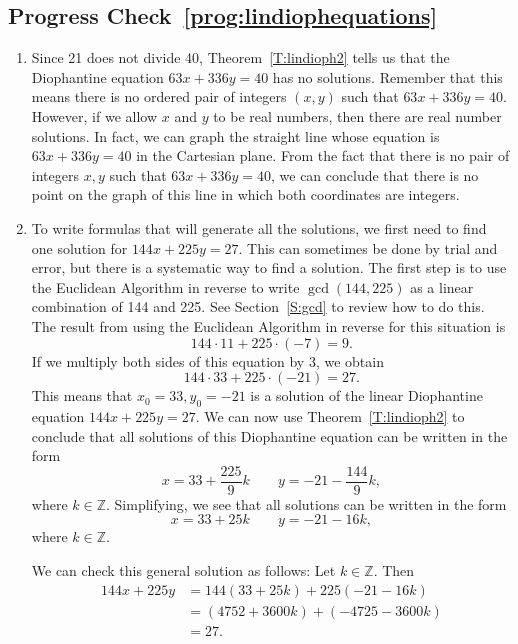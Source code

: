 \subsection*{Progress Check~\ref{prog:lindiophequations}}
\begin{enumerate}
\item Since 21 does not divide 40, Theorem~\ref{T:lindioph2} tells us that the Diophantine equation $63x + 336y = 40$ has no solutions.  
Remember that this means there is no ordered pair of integers $( x, y )$ such that 
$63x + 336y = 40$.  However, if we allow $x$ and $y$ to be real numbers, then there are real number solutions.  In fact, we can graph the straight line whose equation is 
$63x + 336y = 40$ in the Cartesian plane.  From the fact that there is no pair of integers $x, y$ such that $63x + 336y = 40$, we can conclude that there is no point on the graph of this line in which both coordinates are integers.

\item To write formulas that will generate all the solutions, we first need to find one solution for $144x + 225y = 27$.  This can sometimes be done by trial and error, but there is a systematic way to find a solution.  The first step is to use the Euclidean Algorithm in reverse to write $\gcd ( {144, 225} )$ as a linear combination of 144 and 225.  See 
Section~\ref{S:gcd} to review how to do this.  The result from using the Euclidean Algorithm in reverse for this situation is
\[
144 \cdot 11 + 225 \cdot ( {-7} ) = 9.
\]
If we multiply both sides of this equation by 3, we obtain
\[
144 \cdot 33 + 225 \cdot ( {-21} ) = 27.
\]
This means that $x_0 = 33, y_0 = -21$ is a solution of the linear Diophantine equation 
$144x + 225y = 27$.  We can now use Theorem~\ref{T:lindioph2} to conclude that all solutions of this Diophantine equation can be written in the form
\[
x = 33 + \frac{225}{9} k \qquad
y = -21 -\frac{144}{9} k,
\]
where $k \in \mathbb{Z}$.  Simplifying, we see that all solutions can be written in the form
\[
x = 33 + 25 k \qquad
y = -21 -16 k,
\]
where $k \in \mathbb{Z}$.
\vskip10pt

We can check this general solution as follows:  Let $k \in \mathbb{Z}$.  Then
\[
\begin{aligned}
144x + 225y &= 144 ( {33 + 25k} ) + 225 ( {-21 - 16k} ) \\
            &= ( {4752 + 3600k} ) + ( {-4725 - 3600k} ) \\
            &= 27. \\
\end{aligned}
\]


\end{enumerate}
\hbreak


\endinput
